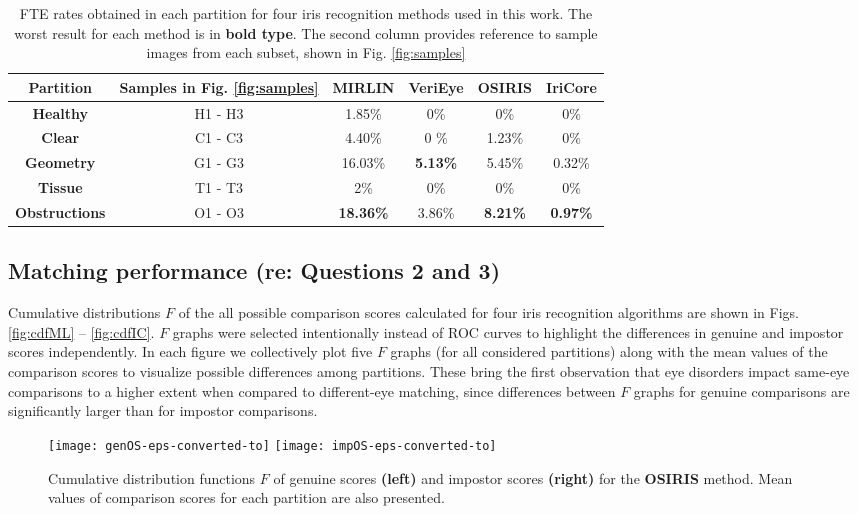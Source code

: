 \documentclass[article,12pt]{elsarticle}
\begin{document}
\begin{table*}[!ht]
\renewcommand{\arraystretch}{1.1}
\caption{FTE rates obtained in each partition for four iris recognition methods used in this work. The worst result for each method is in \textbf{bold type}. The second column provides reference to sample images from each subset, shown in Fig. \ref{fig:samples}}
\label{table:FTE}
\centering\footnotesize
\begin{tabular}[t]{|c|c|c|c|c|c|}
\hline
Partition & Samples in Fig. \ref{fig:samples} & {\bf MIRLIN} & {\bf VeriEye} & {\bf OSIRIS} & {\bf IriCore}\\
\hline
\hline
\textbf{Healthy} & H1 - H3 & 1.85\% & 0\% & 0\% & 0\% \\
\hline
\textbf{Clear} & C1 - C3 & 4.40\%  & 0	\% & 1.23\% & 0\%\\
\hline
\textbf{Geometry} & G1 - G3 & 16.03\% & \textbf{5.13\%} & 5.45\% & 0.32\%\\
\hline
\textbf{Tissue} & T1 - T3 & 2\% & 0\% & 0\% & 0\%\\
\hline
\textbf{Obstructions} & O1 - O3 & \textbf{18.36\%}  &  3.86\% & \textbf{8.21\%} & \textbf{0.97\%}\\
\hline
\end{tabular}
\end{table*}


\subsection{Matching performance (re: Questions 2 and 3)}

Cumulative distributions $F$ of the all possible comparison scores calculated for four iris recognition algorithms are shown in Figs. \ref{fig:cdfML} -- \ref{fig:cdfIC}. $F$ graphs were selected intentionally instead of ROC curves to highlight the differences in genuine and impostor scores independently. In each figure we collectively plot five $F$ graphs (for all considered partitions) along with the mean values of the comparison scores to visualize possible differences among partitions. These bring the first observation that eye disorders impact same-eye comparisons to a higher extent when compared to different-eye matching, since differences between $F$ graphs for genuine comparisons are significantly larger than for impostor comparisons.

\begin{figure}[!htb]
\centering
\texttt{[image: genOS-eps-converted-to]}\hfill
\texttt{[image: impOS-eps-converted-to]}
\caption{Cumulative distribution functions $F$ of genuine scores {\bf (left)} and impostor scores {\bf (right)} for the {\bf OSIRIS} method. Mean values of comparison scores for each partition are also presented.}
\label{fig:cdfOS}
\end{figure}
\end{document}
